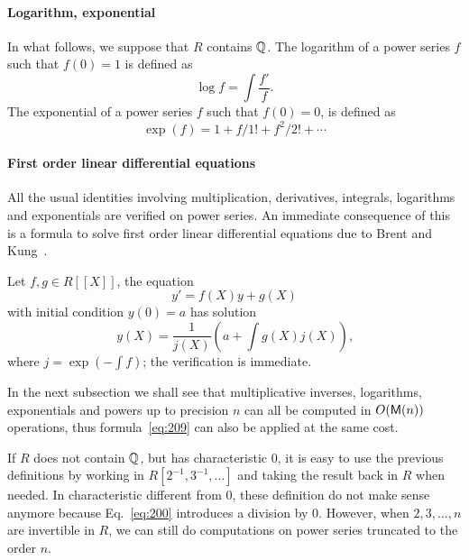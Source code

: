 \paragraph{Logarithm, exponential}
\label{sec:logarithm}
In what follows, we suppose that $R$ contains $\mathbb{Q}$. The
logarithm of a power series $f$
such that $f(0)=1$ is defined as
\begin{equation}
  \label{eq:194}
  \log f = \int\frac{f'}{f}
  \text{.}
\end{equation}
The exponential of a power
series $f$ such that $f(0)=0$, is defined as
\begin{equation}
  \label{eq:195}
  \exp(f) = 1 + f/1! + f^2/2! + \cdots
\end{equation}

\paragraph{First order linear differential equations}
\label{sec:first-order-linear}
All the usual identities involving multiplication, derivatives,
integrals, logarithms and exponentials are verified on power
series. An immediate consequence of this is a formula to solve first
order linear differential equations due to Brent and
Kung~\cite{brent+kung}.

Let $f,g\in
R[[X]]$, the equation
\begin{equation}
  \label{eq:208}
  y' = f(X)y + g(X)
\end{equation}
with initial condition $y(0)=a$ has solution
\begin{equation}
  \label{eq:209}
  y(X) =  \frac{1}{j(X)}\left( a + \int g(X)j(X)\right)
  \text{,}
\end{equation}
where $j = \exp(-\int f)$; the verification is immediate.

In the next subsection we shall see that multiplicative inverses,
logarithms, exponentials and powers up to precision $n$ can all be
computed in $O(\mathsf{M}(n))$ operations, thus formula~\eqref{eq:209} can
also be applied at the same cost.


\begin{nota}
  If $R$ does not contain $\mathbb{Q}$, but has characteristic $0$, it is easy
  to use the previous definitions by working in
  $R[2^{-1},3^{-1},\ldots]$ and taking the result back in $R$ when
  needed. In characteristic different from $0$, these definition do
  not make sense anymore because Eq.~\eqref{eq:200} introduces a
  division by $0$. However, when $2,3,\ldots,n$ are invertible in $R$,
  we can still do computations on power series truncated to the order
  $n$.
\end{nota}


